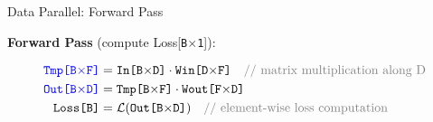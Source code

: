 \documentclass{beamer}
\begin{document}











\begin{frame}[fragile]{Data Parallel: Forward Pass}

\textbf{Forward Pass} (compute Loss[\texttt{B$\times$1}]):\vspace{1mm}

\begin{align*}
\textcolor{blue}{\texttt{Tmp[B$\times$F]}} &= \texttt{In[B$\times$D]} \cdot \texttt{Win[D$\times$F]} \quad \textcolor{gray}{\text{// matrix multiplication along D}} \\
\textcolor{blue}{\texttt{Out[B$\times$D]}} &= \texttt{Tmp[B$\times$F]} \cdot \texttt{Wout[F$\times$D]} \\
\texttt{Loss[B]} &= \mathcal{L}(\texttt{Out[B$\times$D]}) \quad \textcolor{gray}{\text{// element-wise loss computation}}
\end{align*}

\end{frame}
\end{document}
